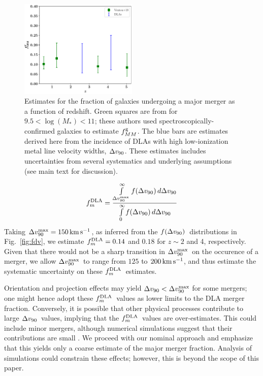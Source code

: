 \documentclass[twocolumn]{aastex62}
\newcommand{\mdvninety}{\Delta v_{\rm 90}}
\newcommand{\dvninety}{$\mdvninety$}
\newcommand{\mdvmax}{\mdvninety^{\rm max}}
\newcommand{\dvmax}{$\mdvmax$}
\newcommand{\mfdv}{f(\mdvninety)}
\newcommand{\fdv}{$\mfdv$}
\newcommand{\mfmdla}{f_m^{\rm DLA}}    %
\newcommand{\fmdla}{$\mfmdla$}
\def\intl{\int\limits}
\newcommand{\mfmg}{f_{MM}^{\rm g}}    %
\newcommand{\fmg}{$\mfmg$}
\newcommand{\mkms}{\rm km \, s^{-1}}
\begin{document}
\begin{figure}
\centering
\includegraphics[width=0.5\textwidth]{fig_mm.pdf}
\vspace{-0.3in}
\caption{Estimates for the fraction of galaxies undergoing a major merger as
a function of redshift.  Green squares are from \cite{ventou+2019} 
for $9.5 < \log(M_*) < 11$; these authors used spectroscopically-confirmed galaxies
to estimate \fmg. The blue bars are estimates derived here from the incidence of DLAs
with high low-ionization metal line velocity widths, \dvninety.  These estimates 
includes uncertainties from several systematics and underlying assumptions (see main text 
for discussion).
}
\label{fig:fmm}
\end{figure}

\begin{equation}
    \mfmdla = \frac{\intl_{\mdvmax}^\infty \mfdv \, d\mdvninety}{
    \intl_0^\infty \mfdv \, d\mdvninety}
\end{equation}
Taking $\mdvmax = 150 \, \mkms$, as inferred from the \fdv\ distributions in 
Fig.~\ref{fig:fdv}, %
we estimate $\mfmdla = 0.14$ and $0.18$ for $z \sim 2$ and 4, respectively. 
Given that there would not be a sharp transition in \dvmax\ on the occurence of 
a merger, we allow \dvmax\ to range from $125$ to $200 \, \mkms$, and thus estimate 
the systematic uncertainty on these \fmdla\ estimates.

Orientation and projection effects may yield $\mdvninety < \mdvmax$ for some mergers;
one might hence adopt these \fmdla\ values as lower limits to the DLA merger 
fraction.  Conversely, it is possible that other physical processes contribute 
to large \dvninety\ values, implying that the \fmdla\ values are over-estimates.
This could include minor mergers, although numerical simulations suggest that their 
contributions are small \citep{bird+15}. We proceed with our nominal approach and 
emphasize that this yields only a coarse estimate of the major merger fraction. Analysis 
of simulations could constrain these effects; however, this is beyond the scope of this paper.
\end{document}
